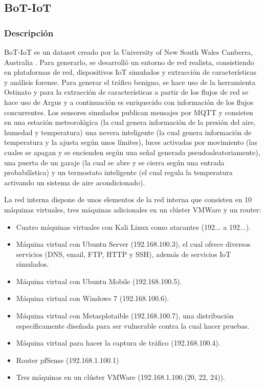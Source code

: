 
\subsection{BoT-IoT}

\subsubsection{Descripción}

BoT-IoT es un dataset creado por la University of New South Wales Canberra, Australia \cite{DBLP:journals/corr/abs-1811-00701}. Para generarlo, se desarrolló un entorno de red realista, consistiendo en plataformas de red, dispositivos IoT simulados y extracción de características y análisis forense. Para generar el tráfico benigno, se hace uso de la herramienta Ostinato \cite{ostinato} y para la extracción de características a partir de los flujos de red se hace uso de Argus \cite{argustool} y a continuación es enriquecido con información de los flujos concurrentes. Los sensores simulados publican mensajes por MQTT y consisten en una estación meteorológica (la cual genera información de la presión del aire, humedad y temperatura) una nevera inteligente (la cual genera información de temperatura y la ajusta según unos límites), luces activadas por movimiento (las cuales se apagan y se encienden según una señal generada pseudoaleatoriamente), una puerta de un garaje (la cual se abre y se cierra según una entrada probabilística) y un termostato inteligente (el cual regula la temperatura activando un sistema de aire acondicionado).

La red interna dispone de unos elementos de la red interna que consisten en 10 máquinas virtuales, tres máquinas adicionales en un clúster VMWare y un router:

\begin{itemize}
    \item Cuatro máquinas virtuales con Kali Linux como atacantes (192... a 192...).
    \item Máquina virtual con Ubuntu Server (192.168.100.3), el cual ofrece diversos servicios (DNS, email, FTP, HTTP y SSH), además de servicios IoT simulados.
    \item Máquina virtual con Ubuntu Mobile (192.168.100.5).
    \item Máquina virtual con Windows 7 (192.168.100.6).
    \item Máquina virtual con Metasplotaible (192.168.100.7), una distribución específicamente diseñada para ser vulnerable contra la cual hacer pruebas.
    \item Máquina virtual para hacer la captura de tráfico (192.168.100.4).
    \item Router pfSense (192.168.1.100.1)
    \item Tres máquinas en un clúster VMWare (192.168.1.100.(20, 22, 24)).
\end{itemize}

